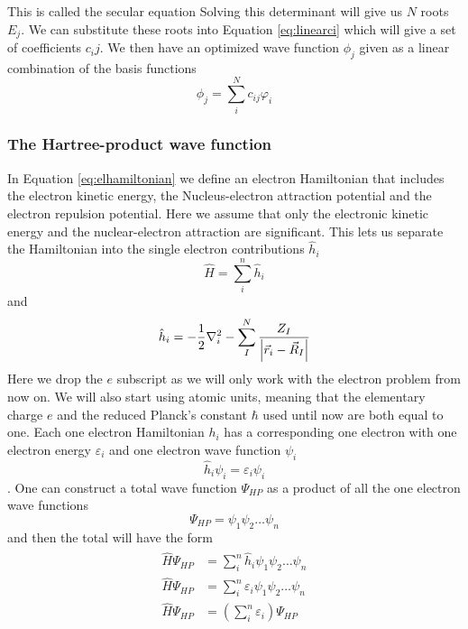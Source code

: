\documentclass[../master_thesis.tex]{subfiles}
\begin{document}
This is called the secular equation \cite{Cramer:2004} Solving this determinant
will give us $N$ roots $E_j$. We can substitute these roots into Equation
\ref{eq:linearci} which will give a set of coefficients $c_ij$. We then have an
optimized wave function $\phi_j$ given as a linear combination of the basis functions
\begin{equation}
  \phi_j = \sum_{i}^N c_{ij}\varphi_i
\end{equation}

\subsubsection{The Hartree-product wave function} %
In Equation \ref{eq:elhamiltonian} we define an electron Hamiltonian that includes
the electron kinetic energy, the Nucleus-electron attraction potential and the
electron repulsion potential. Here we assume that only the electronic kinetic energy and
the nuclear-electron attraction are significant. This lets us separate the Hamiltonian into
the single electron contributions $\hat{h}_i$
\begin{equation}
  \hat{H} = \sum^n_{i} \hat{h}_i
\end{equation}
and
\begin{equation}
  \hat{h}_i = -\frac{1}{2}\nabla^2_i - \sum^N_I \frac{Z_I}{\abs{\vec{r}_i - \vec{R}_I}}
\end{equation}
Here we drop the $e$ subscript as we will only work with the electron problem
from now on. We will also start using atomic units, meaning that the elementary charge $e$ and
the reduced Planck's constant $\hbar$ used until now are both equal to one.
Each one electron Hamiltonian $h_i$ has a corresponding one electron \SE with
one electron energy $\varepsilon_i$ and one electron wave function $\psi_i$
\begin{equation}
  \hat{h}_i\psi_i = \varepsilon_i\psi_i
\end{equation}.
One can construct a total wave function $\Psi_{HP}$ as a product of all the one electron
wave functions
\begin{equation}
  \Psi_{HP} = \psi_1\psi_2\ldots\psi_n
\end{equation}
and then the total \SE  will have the form \cite{Cramer:2004}
\begin{align}
  \begin{split}
    \hat{H}\Psi_{HP} &= \sum^n_{i} \hat{h}_i\psi_1\psi_2\ldots\psi_n\\
    \hat{H}\Psi_{HP} &= \sum_i^n\varepsilon_i\psi_1\psi_2\ldots\psi_n\\
    \hat{H}\Psi_{HP} &= \left(\sum_i^n\varepsilon_i\right)\Psi_{HP}
  \end{split}
\end{align}
\end{document}

